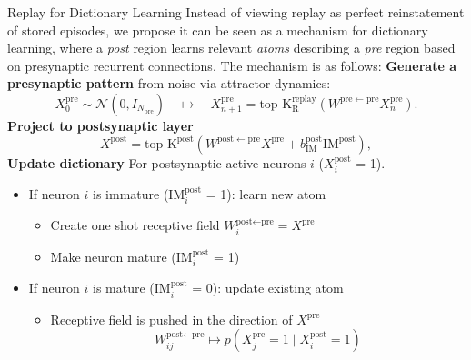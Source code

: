 \documentclass{article}
\begin{document}
\begin{technicalbox}{Replay for Dictionary Learning}
Instead of viewing replay as perfect reinstatement of stored episodes, we propose it can be seen as a mechanism for dictionary learning, where a \textit{post} region learns relevant \textit{atoms} describing a \textit{pre} region based on presynaptic recurrent connections. The mechanism is as follows:
\newline\newline
\textbf{Generate a presynaptic pattern} from noise via attractor dynamics:
\[
X^\mathrm{pre}_{0} \sim \mathcal{N}(0,I_{N_\mathrm{pre}})
\quad \longmapsto \quad
X^\mathrm{pre}_{n+1}
=
\operatorname{top\text{-}K_R^{\mathrm{replay}}}
\left(
W^{\mathrm{pre}\leftarrow \mathrm{pre}} X^\mathrm{pre}_{n}
\right).
\]
\textbf{Project to postsynaptic layer}
\[
X^\mathrm{post}
=
\operatorname{top\text{-}K^\textrm{post}}
\left(
W^{\mathrm{post}\leftarrow\mathrm{pre}}X^\mathrm{pre}
+
b_\mathrm{IM}^\textrm{post}\mathrm{IM^\textrm{post}}
\right),
\]
\textbf{Update dictionary} For postsynaptic active neurons $i$ ($X^\mathrm{post}_i$ = 1).
\begin{itemize}
    \item If neuron $i$ is immature ($\textrm{IM}^\textrm{post}_i$ = 1): learn new atom
    \begin{itemize}
        \item Create one shot receptive field $W_i^{\textrm{post}\leftarrow\textrm{pre}} = X^\textrm{pre}$
        \item Make neuron mature ($\textrm{IM}^\textrm{post}_i$ = 1)
    \end{itemize}
    \item If neuron $i$ is mature  ($\textrm{IM}^\textrm{post}_i$ = 0): update existing atom
    \begin{itemize}
        \item Receptive field is pushed in the direction of $X^\textrm{pre}$
        \[W_{ij}^{\textrm{post}\leftarrow\textrm{pre}} \longmapsto
p(X^\mathrm{pre}_j=1 \mid X^\mathrm{post}_i=1)\]
    \end{itemize}
\end{itemize}
\end{technicalbox}
\end{document}
